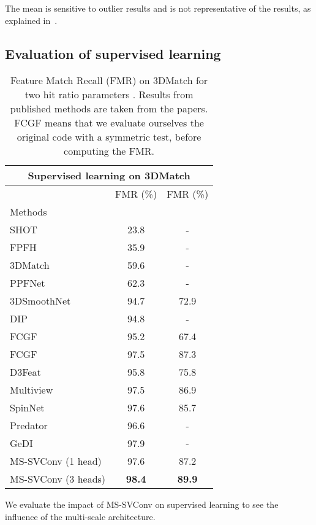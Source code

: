 \documentclass[10pt,twocolumn,letterpaper]{article}
\begin{document}
The mean is sensitive to outlier results and is not representative of the results, as explained in~\cite{fontana2020benchmark}.


\subsection{Evaluation of supervised learning}
\begin{table}[ht]
\small
\centering
\begin{tabular}[t]{lcc}
\toprule
\multicolumn{3}{c}{\textbf{Supervised learning on 3DMatch}} \\
\midrule
 & FMR (\%) & FMR (\%) \\
Methods &  & \\
\midrule

SHOT~\cite{Salti2014SHOTUS} & 23.8 & - \\
FPFH~\cite{rusu_fast_2009} & 35.9 & - \\
3DMatch~\cite{zeng20163dmatch} & 59.6 & - \\
PPFNet~\cite{deng2018ppfnet} & 62.3 & - \\
3DSmoothNet~\cite{gojcic2018perfect} & 94.7 & 72.9\\
DIP~\cite{Poiesi2021} & 94.8 & - \\
FCGF~\cite{choy2019fully} & 95.2 & 67.4 \\
FCGF~\cite{choy2019fully} & 97.5 & 87.3 \\
D3Feat~\cite{bai2020d3feat} & 95.8 & 75.8 \\
Multiview~\cite{Li_2020_CVPR} & 97.5 & 86.9 \\
SpinNet~\cite{ao2020SpinNet} & 97.6 & 85.7 \\
Predator~\cite{huang2020predator} & 96.6 & - \\
GeDI~\cite{Poiesi2021gedi} & 97.9 & - \\
MS-SVConv (1 head) & 97.6 & 87.2 \\
MS-SVConv (3 heads) & \bf{98.4} & \bf{89.9}\\
\bottomrule

\end{tabular}
\caption{Feature Match Recall (FMR) on 3DMatch for two hit ratio parameters . Results from published methods are taken from the papers. FCGF means that we evaluate ourselves the original code with a symmetric test, before computing the FMR.}
\label{tab:resultsSupervised}
\end{table}We evaluate the impact of MS-SVConv on supervised learning to see the influence of the multi-scale architecture.
\end{document}
